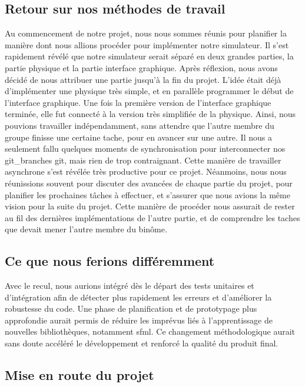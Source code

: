 \subsection{Retour sur nos méthodes de travail}\label{subsec:retour-sur-nos-methodes-de-travail}
Au commencement de notre projet, nous nous sommes réunis pour planifier la manière dont nous allions procéder pour implémenter notre simulateur.
Il s'est rapidement révélé que notre simulateur serait séparé en deux grandes parties, la partie physique et la partie interface graphique.
Après réflexion, nous avons décidé de nous attribuer une partie jusqu'à la fin du projet.
L'idée était déjà d'implémenter une physique très simple, et en parallèle programmer le début de l'interface graphique.
Une fois la première version de l'interface graphique terminée, elle fut connecté à la version très simplifiée de la physique.
Ainsi, nous pouvions travailler indépendamment, sans attendre que l'autre membre du groupe finisse une certaine tache, pour en avancer sur une autre.
Il nous a seulement fallu quelques moments de synchronisation pour interconnecter nos \gls{git_branches} \gls{git}, mais rien de trop contraignant.
Cette manière de travailler asynchrone s'est révélée très productive pour ce projet.
Néanmoins, nous nous réunissions souvent pour discuter des avancées de chaque partie du projet, pour planifier les prochaines tâches à effectuer, et s'assurer que nous avions la même vision pour la suite du projet.
Cette manière de procéder nous assurait de rester au fil des dernières implémentations de l'autre partie, et de comprendre les taches que devait mener l'autre membre du binôme.

\subsection{Ce que nous ferions différemment}\label{subsec:ce-que-nous-ferions-differemment}
Avec le recul, nous aurions intégré dès le départ des tests unitaires et d'intégration afin de détecter plus rapidement les erreurs et d'améliorer la robustesse du code.
Une phase de planification et de prototypage plus approfondie aurait permis de réduire les imprévus liés à l'apprentissage de nouvelles bibliothèques, notamment \gls{sfml}\@.
Ce changement méthodologique aurait sans doute accéléré le développement et renforcé la qualité du produit final.

\subsection{Mise en route du projet}\label{subsec:mise-en-route-du-projet}

